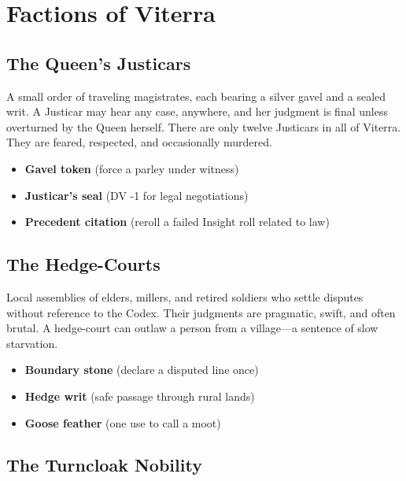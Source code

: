 \documentclass[11pt,twoside]{book}
\newenvironment{sidebar}[1][]
{\begin{tcolorbox}[colback=agedpaper,colframe=royalblue,boxrule=0.5pt,arc=2mm,title={\scshape\small #1},fonttitle=\bfseries]}
{\end{tcolorbox}}
\begin{document}
\chapter{Factions of Viterra}

\section{The Queen's Justicars}

A small order of traveling magistrates, each bearing a silver gavel and a sealed writ. A Justicar may hear any case, anywhere, and her judgment is final unless overturned by the Queen herself. There are only twelve Justicars in all of Viterra. They are feared, respected, and occasionally murdered.

\begin{sidebar}[Strings]
\begin{itemize}
    \item \textbf{Gavel token} (force a parley under witness)
    \item \textbf{Justicar's seal} (DV -1 for legal negotiations)
    \item \textbf{Precedent citation} (reroll a failed Insight roll related to law)
\end{itemize}
\end{sidebar}

\section{The Hedge-Courts}

Local assemblies of elders, millers, and retired soldiers who settle disputes without reference to the Codex. Their judgments are pragmatic, swift, and often brutal. A hedge-court can outlaw a person from a village---a sentence of slow starvation.

\begin{sidebar}[Strings]
\begin{itemize}
    \item \textbf{Boundary stone} (declare a disputed line once)
    \item \textbf{Hedge writ} (safe passage through rural lands)
    \item \textbf{Goose feather} (one use to call a moot)
\end{itemize}
\end{sidebar}

\section{The Turncloak Nobility}
\end{document}
